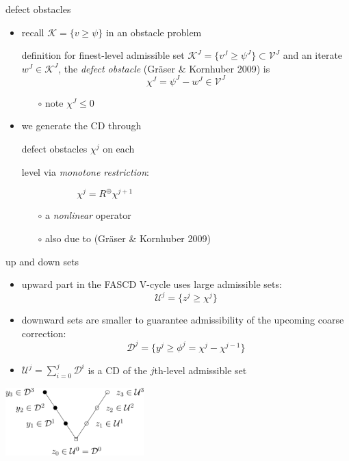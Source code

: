 \documentclass[svgnames,
               hyperref={colorlinks,citecolor=DeepPink4,linkcolor=FireBrick,urlcolor=Maroon},
               usepdftitle=false]  %
               {beamer}
\newcommand{\ds}{\displaystyle}
\begin{document}
\begin{frame}{defect obstacles}

\begin{itemize}
\item recall $\mathcal{K} = \{v \ge \psi\}$ in an obstacle problem
\begin{block}{definition}
for finest-level admissible set $\mathcal{K}^J = \{v^J\ge \psi^J\} \subset \mathcal{V}^J$ and an iterate $w^J \in \mathcal{K}^J$, the \emph{defect obstacle} (Gr\"aser \& Kornhuber 2009) is
    $$\chi^J = \psi^J - w^J \in \mathcal{V}^J$$
\end{block}

    \begin{itemize}
    \item[$\circ$] note $\chi^J \le 0$
    \end{itemize}
\item we generate the CD through

defect obstacles $\chi^j$ on each

level via \emph{monotone restriction}:

$$\chi^j = R^{\oplus} \chi^{j+1} \phantom{smdlfkaj asdfklj asdf sdfaa asddfas dsa}$$

    \begin{itemize}
    \item[$\circ$] a \emph{nonlinear} operator
    \item[$\circ$] {\footnotesize also due to (Gr\"aser \& Kornhuber 2009)}
    \end{itemize}
\end{itemize}

\vspace{-25mm}
\hfill \mbox{}
\end{frame}


\begin{frame}{up and down sets}

\begin{itemize}
\item upward part in the FASCD V-cycle uses large admissible sets:
    $$\mathcal{U}^j = \{z^j \ge \chi^j\}$$
\item downward sets are smaller to guarantee admissibility of the upcoming coarse correction:
    $$\mathcal{D}^j = \{y^j \ge \phi^j=\chi^j - \chi^{j-1}\}$$
\item $\ds \mathcal{U}^j = \sum_{i=0}^j \mathcal{D}^i$ is a CD of the $j$th-level admissible set
\end{itemize}

\begin{center}
\includegraphics[width=0.4\textwidth]{../talk-oxford/images/fascd-vcycle.png}
\end{center}
\end{frame}
\end{document}
